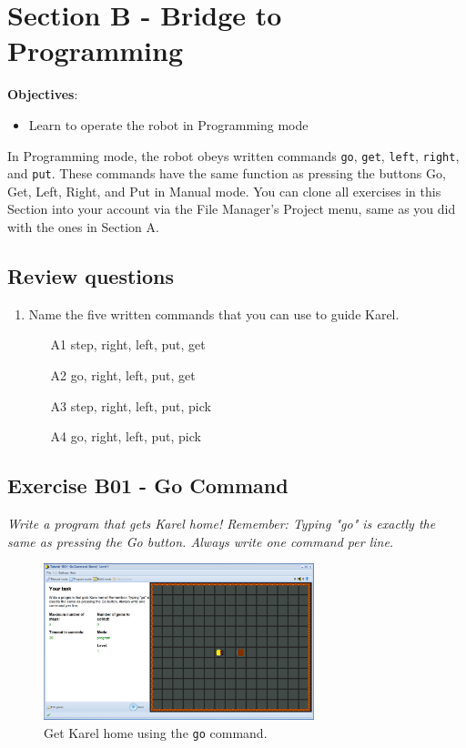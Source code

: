 \documentclass[article,A4,12pt]{llncs}
\begin{document}
\section{Section B - Bridge to Programming}

\noindent
{\bf Objectives}: 
\begin{itemize}
\item Learn to operate the robot in Programming mode
\end{itemize}

\noindent
In Programming mode, the robot obeys written commands {\tt go}, {\tt get}, {\tt left}, {\tt right}, and {\tt put}.
These commands have the same function as pressing the buttons Go, Get, Left, Right, and Put in Manual mode.
You can clone all exercises in this Section into your account via the File Manager's Project
menu, same as you did with the ones in Section A.

\subsection{Review questions}

\begin{enumerate}
\item Name the five written commands that you can use to guide Karel.
\begin{enumerate}
\item[A1] step, right, left, put, get
\item[A2] go, right, left, put, get
\item[A3] step, right, left, put, pick
\item[A4] go, right, left, put, pick
\end{enumerate}
\end{enumerate}

\subsection{Exercise B01 - Go Command}

{\em Write a program that gets Karel home! Remember: Typing "go" is exactly 
the same as pressing the Go button. Always write one command per line.}

\begin{figure}[!ht]
\begin{center}
\includegraphics[width=0.7\textwidth]{img/b01.png}
\end{center}
\vspace{-4mm}
\caption{Get Karel home using the {\tt go} command.}
\label{fig:b01}
\vspace{-4mm}
\end{figure}
\noindent
\end{document}
